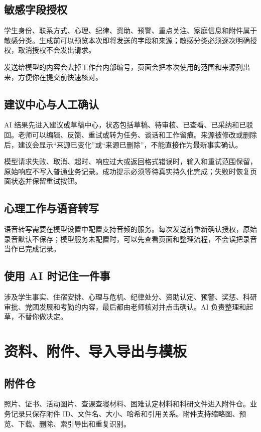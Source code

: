 \documentclass[UTF8,zihao=-4,oneside]{ctexrep}
\begin{document}
\section{敏感字段授权}

学生身份、联系方式、心理、纪律、资助、预警、重点关注、家庭信息和附件属于敏感分类。生成前可以预览本次即将发送的字段和来源；敏感分类必须逐次明确授权，取消授权不会发出请求。

发送给模型的内容会去掉工作台内部编号，页面会把本次使用的范围和来源列出来，方便你在提交前快速核对。

\section{建议中心与人工确认}

AI 结果先进入建议或草稿中心，状态包括草稿、待审核、已查看、已采纳和已驳回。老师可以编辑、反馈、重试或转为任务、谈话和工作留痕。来源被修改或删除后，建议会显示“来源已变化”或“来源已删除”，不能直接作为最新事实确认。

模型请求失败、取消、超时、响应过大或返回格式错误时，输入和重试范围保留，原始响应不写入普通业务记录。成功提示必须等待真实持久化完成；失败时恢复页面状态并保留重试按钮。

\section{心理工作与语音转写}

语音转写需要在模型设置中配置支持音频的服务。每次发送前重新确认授权，原始录音默认不保存；模型服务未配置时，可以先查看页面和整理流程，不会误把录音当作已完成记录。

\section{使用 AI 时记住一件事}

涉及学生事实、住宿安排、心理与危机、纪律处分、资助认定、预警、奖惩、科研审批、党团发展和考勤的内容，最后都由老师核对并点击确认。AI 负责整理和起草，不替你做决定。

\chapter{资料、附件、导入导出与模板}

\section{附件仓}

照片、证书、活动图片、查课查寝材料、困难认定材料和科研文件进入附件仓。业务记录只保存附件 ID、文件名、大小、哈希和引用关系。附件支持缩略图、预览、下载、删除、索引导出和重复识别。
\end{document}

